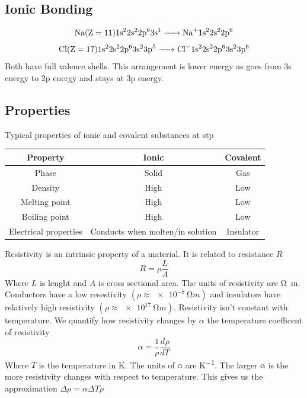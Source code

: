 \documentclass{article}
\newcommand{\dv}[3][]{\frac{d^{#1}{#2}}{d{#3}^{#1}}}
\begin{document}
\subsection*{Ionic Bonding}

\[\text{\ce{Na}}(\mathrm{Z}=11)\mathrm{1s^22s^22p^63s^1}\ce{->Na+}\mathrm{1s^22s^22p^6}\]
\[\text{\ce{Cl}}(\mathrm{Z}=17)\mathrm{1s^22s^22p^63s^23p^5}\ce{->Cl-}\mathrm{1s^22s^22p^63s^23p^6}\]
Both have full valence shells. This arrangement is lower energy as  goes from 3s energy to 2p energy and  stays at 3p energy.

\subsection*{Properties}
Typical properties of ionic and covalent substances at stp
\begin{center}
\begin{tabular}{|c|cc|}\hline
 Property & Ionic & Covalent\\ \hline
 Phase & Solid & Gas\\
 Density & High & Low\\
 Melting point & High & Low\\
 Boiling point & High & Low\\
 Electrical properties & Conducts when molten/in solution & Insulator\\\hline
\end{tabular}
\end{center}

Resistivity is an intrinsic property of a material. It is related to resistance \(R\)
\[R=\rho\frac{L}{A}\]
Where \(L\) is lenght and \(A\) is cross sectional area. The units of resistivity are \si{\ohm m}. Conductors have a low resestivity \((\rho\approx\SI{e-8}{\ohm m})\) and insulators have relatively high resistivity \((\rho\approx\SI{e17}{\ohm m})\). Resistivity isn't constant with temperature. We quantify how resistivity changes  by \(\alpha\) the temperature coefficent of resistivity
\[\alpha=\frac{1}{\rho}\dv{\rho}{T}\]
Where \(T\) is the temperature in \si{K}. The units of \(\alpha\) are \si{K^{-1}}. The larger \(\alpha\) is the more resistivity changes with respect to temperature. This gives us the approximation \(\Delta\rho=\alpha\Delta T\rho\)


\end{document}
